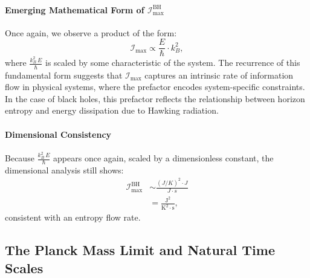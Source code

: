 \documentclass[12pt]{article}
\begin{document}
\paragraph{Emerging Mathematical Form of \(\mathcal{I}_{\text{max}}^{\text{BH}}\)}
Once again, we observe a product of the form:
\begin{equation}
    \mathcal{I}_{\text{max}} \propto \frac{E}{\hbar} \cdot k_B^2,
\end{equation}
where \(\frac{k_B^2\,E}{\hbar}\) is scaled by some characteristic of the system. The recurrence of this fundamental form suggests that \(\mathcal{I}_{\text{max}}\) captures an intrinsic rate of information flow in physical systems, where the prefactor encodes system-specific constraints. In the case of black holes, this prefactor reflects the relationship between horizon entropy and energy dissipation due to Hawking radiation.

\paragraph{Dimensional Consistency}
Because \(\frac{k_B^2\,E}{\hbar}\) appears once again, scaled by a dimensionless constant, the dimensional analysis still shows:
\begin{align}
    \mathcal{I}_{\text{max}}^{\text{BH}} &\sim \frac{(J / K)^2 \cdot J}{J \cdot s} \nonumber \\
    &= \frac{\text{J}^2}{\text{K}^2 \cdot \text{s}},
\end{align}
consistent with an entropy flow rate.


\subsection{The Planck Mass Limit and Natural Time Scales}
\end{document}
